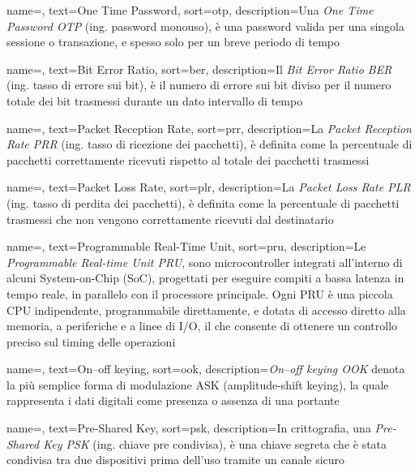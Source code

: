  {
    name=,
    text=One Time Password,
    sort=otp,
    description={Una \emph{One Time Password OTP} (ing. password monouso), è una password valida per una singola sessione o transazione, e spesso solo per un breve periodo di tempo} 
}

 {
    name=,
    text=Bit Error Ratio,
    sort=ber,
    description={Il \emph{Bit Error Ratio BER} (ing. tasso di errore sui bit), è il numero di errore sui bit diviso per il numero totale dei bit trasmessi durante un dato intervallo di tempo}
}

 {
    name=,
    text=Packet Reception Rate,
    sort=prr,
    description={La \emph{Packet Reception Rate PRR} (ing. tasso di ricezione dei pacchetti), è definita come la percentuale di pacchetti correttamente ricevuti rispetto al totale dei pacchetti trasmessi}
}

 {
    name=,
    text=Packet Loss Rate,
    sort=plr,
    description={La \emph{Packet Loss Rate PLR} (ing. tasso di perdita dei pacchetti), è definita come la percentuale di pacchetti trasmessi che non vengono correttamente ricevuti dal destinatario}
}

 {
    name=,
    text=Programmable Real-Time Unit,
    sort=pru,
    description={Le \emph{Programmable Real-time Unit PRU}, sono microcontroller integrati all'interno di alcuni System-on-Chip (SoC), progettati per eseguire compiti a bassa latenza in tempo reale, in parallelo con il processore principale. Ogni PRU è una piccola CPU indipendente, programmabile direttamente, e dotata di accesso diretto alla memoria, a periferiche e a linee di I/O, il che consente di ottenere un controllo preciso sul timing delle operazioni}
}

 {
    name=,
    text=On–off keying,
    sort=ook,
    description={\emph{On–off keying OOK} denota la più semplice forma di modulazione ASK (amplitude-shift keying), la quale rappresenta i dati digitali come presenza o assenza di una portante}
}

 {
    name=,
    text=Pre-Shared Key,
    sort=psk,
    description={In crittografia, una \emph{Pre-Shared Key PSK} (ing. chiave pre condivisa), è una chiave segreta che è stata condivisa tra due dispositivi prima dell'uso tramite un canale sicuro}
}
